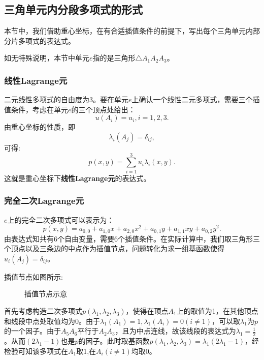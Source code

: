 \subsection{三角单元内分段多项式的形式}
本节中，我们借助重心坐标，在有合适插值条件的前提下，写出每个三角单元内部分片多项式的表达式。

如无特殊说明，本节中单元$e$指的是三角形$\triangle A_{1}A_{2}A_{3}$。
\subsubsection{线性Lagrange元}
二元线性多项式的自由度为3。要在单元$e$上确认一个线性二元多项式，需要三个插值条件，考虑在单元$e$的三个顶点处给出：
\begin{equation}
    \label{eq:LinearCond}
    u(A_{i})=u_{i},i=1,2,3.
\end{equation}
由重心坐标的性质，即
\begin{equation}
    \lambda_{i}(A_{j})=\delta_{ij},
\end{equation}
可得:
\begin{equation}
    p(x,y)=\sum_{i=1}^{3}u_{i}\lambda_{i}(x,y).
\end{equation}
这就是重心坐标下\textbf{线性Lagrange元}的表达式。
\subsubsection{完全二次Lagrange元}
$e$上的完全二次多项式可以表示为：
\begin{equation}
    p(x,y)=a_{0,0}+a_{1,0}x+a_{2,0}x^2+a_{0,1}y+a_{1,1}xy+a_{0,2}y^{2}.
\end{equation}
由表达式知共有6个自由变量，需要6个插值条件。在实际计算中，我们取三角形三个顶点以及三条边的中点作为插值节点，问题转化为求一组基函数使得$u_{i}(A_{j})=\delta_{ij}$。

插值节点如图所示:
\begin{figure}[H]
    \caption{插值节点示意}
    \centering
{}
\end{figure}
首先考虑构造二次多项式$p(\lambda_{1},\lambda_{2},\lambda_{3})$，使得在顶点$A_{1}$上的取值为1，在其他顶点和线段中点处取值均为0。由于$\lambda_{1}(A_{1})=1,\lambda_{1}(A_{i})=0(i\neq 1)$，可以取$\lambda_{1}$为$p$的一个因子。由于$A_{5}A_{6}$平行于$A_{2}A_{3}$，且为中点连线，故该线段的表达式为$\lambda_{1}=\frac{1}{2}$。从而$(2\lambda_{1}-1)$也是$p$的因子。此时取基函数$p(\lambda_{1},\lambda_{2},\lambda_{3})=\lambda_{1}(2\lambda_{1}-1)$，经检验可知该多项式在$A_{1}$取1,在$A_{i}(i\neq 1)$均取0。

